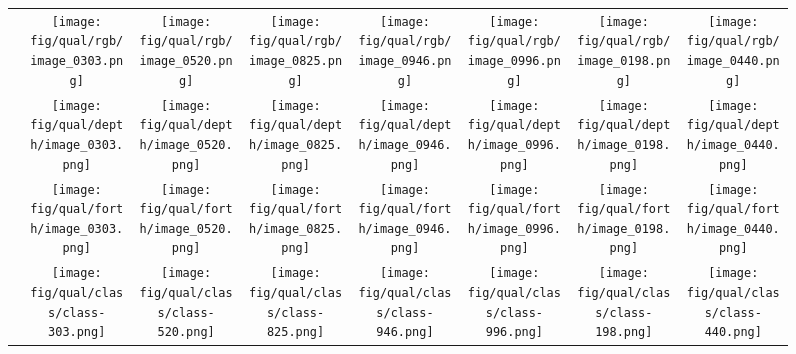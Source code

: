 \begin{figure*}[ht]
	\renewcommand\arraystretch{0.4}
	\begin{tabular}{@{}p{1.5cm}@{}c@{}c@{}c@{}c@{}c@{}c@{}c}
	\raisebox{10mm}{\small RGB} &  
	\texttt{[image: fig/qual/rgb/image\_0303.png]} & 
	\texttt{[image: fig/qual/rgb/image\_0520.png]} &
	\texttt{[image: fig/qual/rgb/image\_0825.png]} & 
	\texttt{[image: fig/qual/rgb/image\_0946.png]} & 
	\texttt{[image: fig/qual/rgb/image\_0996.png]} & 
	\texttt{[image: fig/qual/rgb/image\_0198.png]} & 
	\texttt{[image: fig/qual/rgb/image\_0440.png]} \\
	\raisebox{10mm}{\small Depth} &  
	\texttt{[image: fig/qual/depth/image\_0303.png]} &  
	\texttt{[image: fig/qual/depth/image\_0520.png]} &
	\texttt{[image: fig/qual/depth/image\_0825.png]} &
	\texttt{[image: fig/qual/depth/image\_0946.png]} &
	\texttt{[image: fig/qual/depth/image\_0996.png]} &
	\texttt{[image: fig/qual/depth/image\_0198.png]} &
	\texttt{[image: fig/qual/depth/image\_0440.png]} \\
	\raisebox{10mm}{\small FORTH} &  
	\texttt{[image: fig/qual/forth/image\_0303.png]} & 
	\texttt{[image: fig/qual/forth/image\_0520.png]} &
	\texttt{[image: fig/qual/forth/image\_0825.png]} &
	\texttt{[image: fig/qual/forth/image\_0946.png]} &
	\texttt{[image: fig/qual/forth/image\_0996.png]} &
	\texttt{[image: fig/qual/forth/image\_0198.png]} &
	\texttt{[image: fig/qual/forth/image\_0440.png]} \\
	\raisebox{10mm}{\parbox{1.3cm}{\small Classfication\\(Ours)}} &  
	\texttt{[image: fig/qual/class/class-303.png]} & 
	\texttt{[image: fig/qual/class/class-520.png]} &
	\texttt{[image: fig/qual/class/class-825.png]} & 
	\texttt{[image: fig/qual/class/class-946.png]} &
	\texttt{[image: fig/qual/class/class-996.png]} &
	\texttt{[image: fig/qual/class/class-198.png]} &
	\texttt{[image: fig/qual/class/class-440.png]} \\

\end{tabular}
\end{figure*}
